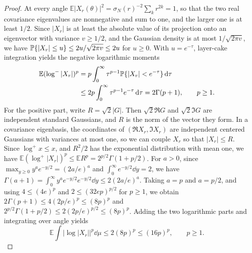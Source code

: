 \begin{proof}
At every angle
$\mathbb E|X_r(\theta)|^2=\sigma_N(r)^{-2}\sum_kr^{2k}=1$, so that the
two real covariance eigenvalues are nonnegative and sum to one, and the
larger one is at least $1/2$.
Since $|X_r|$ is at least the absolute value of its projection onto an
eigenvector with variance $v\ge1/2$, and the Gaussian density is at most
$1/\sqrt{2\pi v}$, we have
$\mathbb P\{|X_r|\le u\}\le2u/\sqrt{2\pi v}\le2u$ for $u\ge0$.
With $u=e^{-\tau}$, layer-cake integration yields the negative
logarithmic moments
\begin{align*}
 \mathbb E(\log^-|X_r|)^p
 &=p\int_0^\infty\tau^{p-1}\mathbb P\{|X_r|<e^{-\tau}\}\,\mathrm d\tau\\
 &\le2p\int_0^\infty\tau^{p-1}e^{-\tau}\,\mathrm d\tau
 =2\Gamma(p+1),\qquad p\ge1.
\end{align*}
For the positive part, write $R=\sqrt2|G|$.
Then $\sqrt2\Re G$ and $\sqrt2\Im G$ are independent standard Gaussians,
and $R$ is the norm of the vector they form.
In a covariance eigenbasis, the coordinates of $(\Re X_r,\Im X_r)$ are
independent centered Gaussians with variances at most one, so we can
couple $X_r$ so that $|X_r|\le R$.
Since $\log^+x\le x$, and $R^2/2$ has the exponential distribution with
mean one, we have
$\mathbb E(\log^+|X_r|)^p\le\mathbb ER^p=2^{p/2}\Gamma(1+p/2)$.
For $a>0$, since $\max_{y\ge0}y^ae^{-y/2}=(2a/e)^a$ and
$\int_0^\infty e^{-y/2}\dd y=2$, we have
$\Gamma(a+1)=\int_0^\infty y^ae^{-y/2}e^{-y/2}\dd y\le2(2a/e)^a$.
Taking $a=p$ and $a=p/2$, and using $4\le(4e)^p$ and
$2\le(32ep)^{p/2}$ for $p\ge1$, we obtain
$2\Gamma(p+1)\le4(2p/e)^p\le(8p)^p$ and
$2^{p/2}\Gamma(1+p/2)\le2(2p/e)^{p/2}\le(8p)^p$.
Adding the two logarithmic parts and integrating over angle yields
\begin{equation}
 \mathbb E\int|\log|X_r||^p\dd\mu
 \le2(8p)^p\le(16p)^p,
 \qquad p\ge1.                                        \label{eq:layer2-gaussianlog}
\end{equation}


\end{proof}
